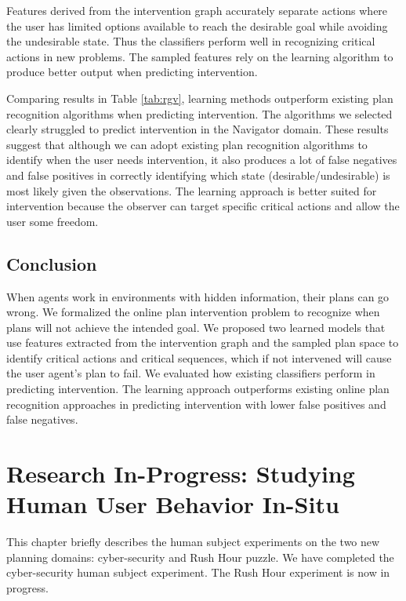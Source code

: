 \documentclass[doctor]{thesis} %
\theoremstyle{plain}
\begin{document}
Features derived from the intervention graph accurately separate actions where the user has limited options available to reach the desirable goal while avoiding the undesirable state. Thus the classifiers perform well in recognizing critical actions in new problems. The sampled features rely on the learning algorithm to produce better output when predicting intervention. 

Comparing results in Table \ref{tab:rgv}, learning methods outperform existing plan recognition algorithms when predicting intervention. The algorithms we selected clearly struggled to predict intervention in the Navigator domain. 
These results suggest that although we can adopt existing plan recognition algorithms to identify when the user needs intervention, it also produces a lot of false negatives and false positives in correctly identifying which state (desirable/undesirable) is most likely given the observations. The learning approach is better suited for intervention because the observer can target specific critical actions and allow the user some freedom.

\section*{Conclusion}
When agents work in environments with hidden information, their plans can go wrong.
We formalized the online plan intervention problem to recognize when plans will not achieve the intended goal. We proposed two learned models that use features extracted from the intervention graph and the sampled plan space to identify critical actions and critical sequences, which if not intervened will cause the user agent's plan to fail. We evaluated how existing classifiers perform in predicting intervention. The learning approach outperforms existing online plan recognition approaches in predicting intervention with lower false positives and false negatives.



\chapter{Research In-Progress: Studying Human User Behavior In-Situ}


This chapter briefly describes the human subject experiments on the two new planning domains: cyber-security and Rush Hour puzzle. We have completed the cyber-security human subject experiment. The Rush Hour experiment is now in progress.
\end{document}
